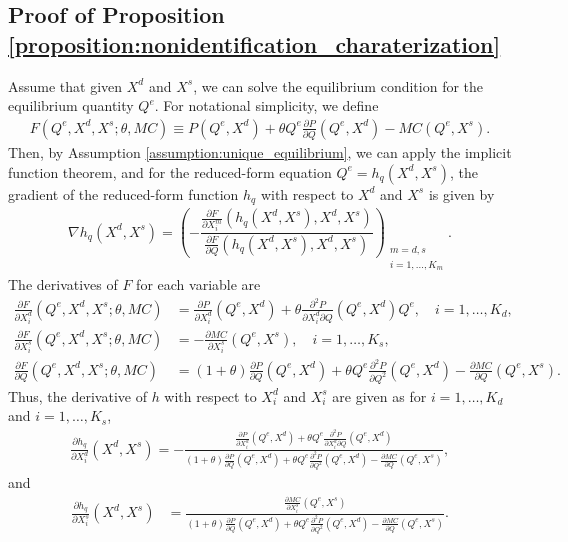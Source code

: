 \documentclass[11pt, a4paper]{article}
\theoremstyle{remark}
\begin{document}
\subsection{Proof of Proposition \ref{proposition:nonidentification_charaterization}}
Assume that given $X^{d}$ and $X^{s}$, we can solve the equilibrium condition for the equilibrium quantity $Q^e$.
For notational simplicity, we define
\begin{align}
    F(Q^e, X^{d}, X^{s}; \theta, MC) \equiv P(Q^e, X^{d}) + \theta Q^e\frac{\partial P}{\partial Q}(Q^e, X^{d}) - MC(Q^e, X^{s}).
\end{align}
Then, by Assumption \ref{assumption:unique_equilibrium}, we can apply the implicit function theorem, and for the reduced-form equation $Q^e = h_q(X^{d}, X^{s})$, the gradient of the reduced-form function $h_q$ with respect to $X^{d}$ and $X^{s}$ is given by
\begin{align}
    \nabla h_q(X^{d}, X^{s}) =  \left( -\dfrac{\frac{\partial F}{\partial X^{m}_{i}}(h_q(X^{d}, X^{s}), X^{d}, X^{s})}{\frac{\partial F}{\partial Q}(h_q(X^{d}, X^{s}), X^{d}, X^{s})} \right)_{\substack{m = d, s\\ i = 1, \ldots, K_m}}. \label{eq:foc_derivative_demand_supply}
\end{align}
The derivatives of $F$ for each variable are
\begin{align}
    \frac{\partial F}{\partial X^{d}_i}(Q^e, X^{d}, X^{s}; \theta, MC) & =  \frac{\partial P}{\partial X^{d}_{i}}(Q^e, X^{d}) + \theta\frac{\partial^2 P}{\partial X^{d}_{i}\partial Q}(Q^e, X^{d})Q^e, \quad i = 1, \ldots, K_d,\\
    \frac{\partial F}{\partial X^{s}_i}(Q^e, X^{d}, X^{s}; \theta, MC) & =  -\frac{\partial MC}{\partial X^{s}_{i}}(Q^e, X^{s}), \quad i = 1, \ldots, K_s, \\
    \frac{\partial F}{\partial Q}(Q^e, X^{d}, X^{s}; \theta, MC) & = (1+\theta)\frac{\partial P}{\partial Q}(Q^e, X^{d}) + \theta Q^e\frac{\partial^2 P}{\partial Q^2}(Q^e, X^{d}) - \frac{\partial MC}{\partial Q}(Q^e, X^{s}).
\end{align}
Thus, the derivative of $h$ with respect to $X^{d}_i$ and $X^{s}_i$ are given as for $i = 1, \ldots, K_d$ and $i = 1, \ldots, K_s$,
\begin{align}
    \frac{\partial h_q}{\partial X^{d}_{i}}(X^{d}, X^{s}) = -\frac{\frac{\partial P}{\partial X^{d}_{i}}(Q^e, X^{d}) + \theta Q^e \frac{\partial^2 P}{\partial X^{d}_{i}\partial Q}(Q^e, X^{d}) }{(1+\theta)\frac{\partial P}{\partial Q}(Q^e, X^{d}) + \theta  Q^e\frac{\partial^2 P}{\partial Q^2}(Q^e, X^{d}) - \frac{\partial MC}{\partial Q}(Q^e, X^{s})}, \label{eq:foc_derivative_demand}
\end{align}
and
\begin{align}
    \frac{\partial h_q}{\partial X^{s}_{i}}(X^{d}, X^{s}) & = \frac{\frac{\partial MC}{\partial X^{s}_{i}}(Q^e, X^{s})}{(1+\theta)\frac{\partial P}{\partial Q}(Q^e, X^{d}) + \theta  Q^e\frac{\partial^2 P}{\partial Q^2}(Q^e, X^{d}) - \frac{\partial MC}{\partial Q}(Q^e, X^{s})}. \label{eq:foc_derivative_supply}
\end{align}
\end{document}
